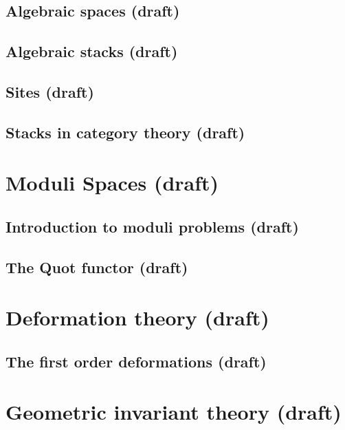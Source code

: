 \documentclass[sectionlevel=book]{noteformyself}
\begin{document}
        \section{Algebraic spaces (draft)}
        
        \section{Algebraic stacks (draft)}
        
        \section{Sites (draft)}
        
        \section{Stacks in category theory (draft)}
        

    \chapter{Moduli Spaces (draft)}
        \section{Introduction to moduli problems (draft)}
        
        \section{The Quot functor (draft)}
        

    \chapter{Deformation theory (draft)}
        \section{The first order deformations (draft)}
        

    \chapter{Geometric invariant theory (draft)}
\end{document}
